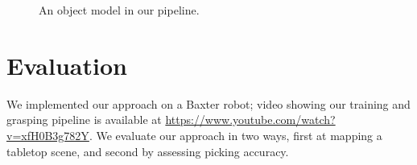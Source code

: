 \documentclass[graybox]{svmult}
\begin{document}
\begin{figure}


\caption{An object model in our pipeline.\label{fig:ruler_model}}
\end{figure}


\section{Evaluation}

We implemented our approach on a Baxter robot; video showing our
training and grasping pipeline is available at
\url{https://www.youtube.com/watch?v=xfH0B3g782Y}.  We evaluate our
approach in two ways, first at mapping a tabletop scene, and second by
assessing picking accuracy.
\end{document}

